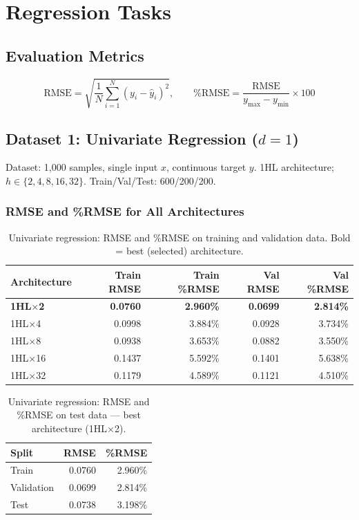 \documentclass[11pt,a4paper]{article}
\begin{document}
\section{Regression Tasks}

\subsection{Evaluation Metrics}

\begin{equation}
\text{RMSE} = \sqrt{\frac{1}{N}\sum_{i=1}^{N}(y_i - \hat{y}_i)^2}, \qquad \%\text{RMSE} = \frac{\text{RMSE}}{y_{\max} - y_{\min}} \times 100
\end{equation}

\subsection{Dataset 1: Univariate Regression ($d=1$)}

Dataset: 1,000 samples, single input $x$, continuous target $y$. 1HL architecture; $h \in \{2,4,8,16,32\}$. Train/Val/Test: 600/200/200.

\subsubsection*{RMSE and \%RMSE for All Architectures}

\begin{table}[H]
\centering
\caption{Univariate regression: RMSE and \%RMSE on training and validation data. Bold = best (selected) architecture.}
\begin{tabular}{lrrrr}
\toprule
Architecture & Train RMSE & Train \%RMSE & Val RMSE & Val \%RMSE \\
\midrule
\textbf{1HL$\times$2}  & \textbf{0.0760} & \textbf{2.960\%} & \textbf{0.0699} & \textbf{2.814\%} \\
1HL$\times$4  & 0.0998 & 3.884\% & 0.0928 & 3.734\% \\
1HL$\times$8  & 0.0938 & 3.653\% & 0.0882 & 3.550\% \\
1HL$\times$16 & 0.1437 & 5.592\% & 0.1401 & 5.638\% \\
1HL$\times$32 & 0.1179 & 4.589\% & 0.1121 & 4.510\% \\
\bottomrule
\end{tabular}
\end{table}

\begin{table}[H]
\centering
\caption{Univariate regression: RMSE and \%RMSE on test data --- best architecture (1HL$\times$2).}
\begin{tabular}{lrr}
\toprule
Split & RMSE & \%RMSE \\
\midrule
Train      & 0.0760 & 2.960\% \\
Validation & 0.0699 & 2.814\% \\
Test       & 0.0738 & 3.198\% \\
\bottomrule
\end{tabular}
\end{table}
\end{document}
